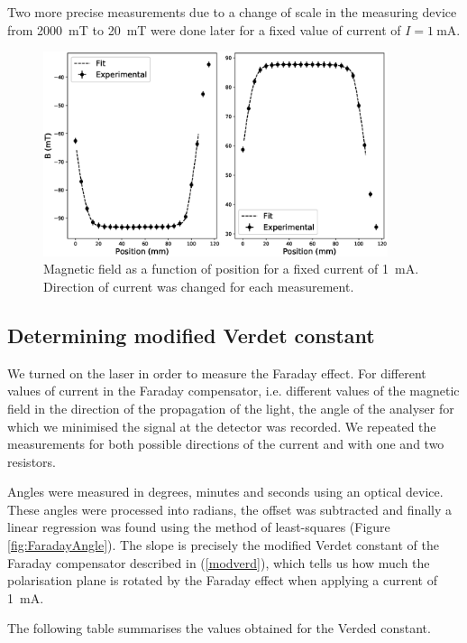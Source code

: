 \documentclass[11pt,a4paper]{article}
\begin{document}
Two more precise measurements due to a change of scale in the measuring device from \SI{2000}{mT} to \SI{20}{mT} were done later for a fixed value of current of $I=\SI{1}{\mA}$.

\begin{figure}[H]
\centering
\includegraphics[width=0.9\textwidth]{B_diff_position2.eps}
\caption{Magnetic field as a function of position for a fixed current of \SI{1}{\mA}. Direction of current was changed for each measurement.}
\label{fig:BvsPos2}
\end{figure}

\subsection{Determining modified Verdet constant}

We turned on the laser in order to measure the Faraday effect. For different values of current in the Faraday compensator, i.e. different values of the magnetic field in the direction of the propagation of the light, the angle of the analyser for which we minimised the signal at the detector was recorded. We repeated the measurements for both possible directions of the current and with one and two resistors.

Angles were measured in degrees, minutes and seconds using an optical device. These angles were processed into radians, the offset was subtracted and finally a linear regression was found using the method of least-squares (Figure \ref{fig:FaradayAngle}). The slope is precisely the modified Verdet constant of the Faraday compensator described in (\ref{modverd}), which tells us how much the polarisation plane is rotated by the Faraday effect when applying a current of \SI{1}{mA}.

The following table summarises the values obtained for the Verded constant.
\end{document}

